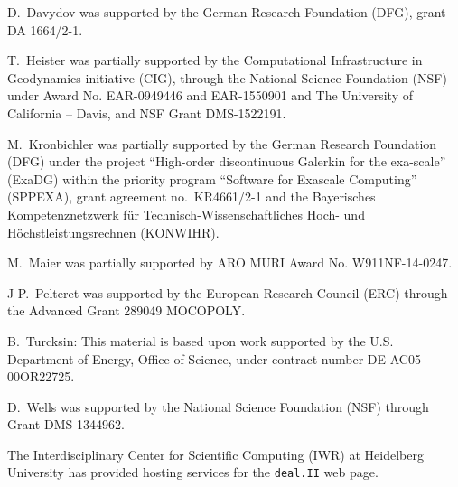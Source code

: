 \documentclass{ansarticle-preprint}
\newcommand{\specialword}[1]{\texttt{#1}}
\newcommand{\dealii}{{\specialword{deal.II}}}
\begin{document}
D.~Davydov was supported by the German Research Foundation (DFG), grant DA
1664/2-1.

T.~Heister was partially supported by the Computational Infrastructure in
Geodynamics initiative (CIG), through the National Science Foundation (NSF)
under Award No. EAR-0949446 and EAR-1550901 and The University of
California -- Davis, and NSF Grant DMS-1522191.

M.~Kronbichler was partially supported by the German Research Foundation (DFG)
under the project ``High-order discontinuous Galerkin for the exa-scale''
(ExaDG) within the priority program ``Software for Exascale Computing''
(SPPEXA), grant agreement no.~KR4661/2-1 and the Bayerisches Kompetenznetzwerk
f\"ur Technisch-Wissenschaftliches Hoch- und H\"ochstleistungsrechnen
(KONWIHR).

M.~Maier was partially supported by ARO MURI Award No. W911NF-14-0247.

J-P.~Pelteret was supported by the European Research Council (ERC) through
the Advanced Grant 289049 MOCOPOLY.

B.~Turcksin: This material is based upon work supported by the U.S.
Department of Energy, Office of Science, under contract number
DE-AC05-00OR22725.

D.~Wells was supported by the National Science Foundation (NSF) through Grant
DMS-1344962.

The Interdisciplinary Center for Scientific Computing (IWR) at Heidelberg
University has provided hosting services for the \dealii{} web page.


{}

\end{document}
